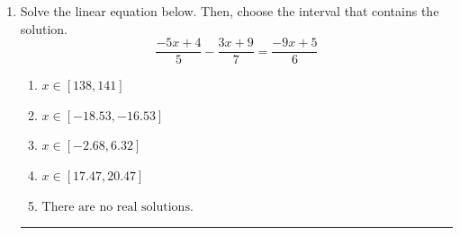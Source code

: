 \documentclass[14pt]{extbook}
\newcommand{\litem}[1]{\item#1\hspace*{-1cm}\rule{\textwidth}{0.4pt}}
\begin{document}
\begin{enumerate}
{\begin{enumerate}[label=\Alph*.]
\end{enumerate} }
\litem{
Solve the linear equation below. Then, choose the interval that contains the solution.\[ \frac{-5x + 4}{5} - \frac{3x + 9}{7} = \frac{-9x + 5}{6} \]\begin{enumerate}[label=\Alph*.]
\item \( x \in [138, 141] \)
\item \( x \in [-18.53, -16.53] \)
\item \( x \in [-2.68, 6.32] \)
\item \( x \in [17.47, 20.47] \)
\item \( \text{There are no real solutions.} \)

\end{enumerate} }
\end{enumerate}
\end{document}
